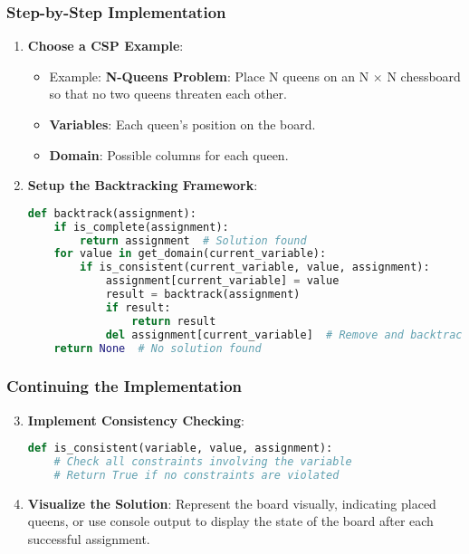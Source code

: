 \documentclass[aspectratio=169]{beamer}
\begin{document}
\begin{frame}[fragile]
    \frametitle{Step-by-Step Implementation}
    \begin{enumerate}
        \item \textbf{Choose a CSP Example}:
            \begin{itemize}
                \item Example: \textbf{N-Queens Problem}: Place N queens on an N $\times$ N chessboard so that no two queens threaten each other.
                \item \textbf{Variables}: Each queen's position on the board.
                \item \textbf{Domain}: Possible columns for each queen.
            \end{itemize}
        \item \textbf{Setup the Backtracking Framework}:
            \begin{lstlisting}[language=Python]
def backtrack(assignment):
    if is_complete(assignment):
        return assignment  # Solution found
    for value in get_domain(current_variable):
        if is_consistent(current_variable, value, assignment):
            assignment[current_variable] = value
            result = backtrack(assignment)
            if result:
                return result
            del assignment[current_variable]  # Remove and backtrack
    return None  # No solution found
            \end{lstlisting}
    \end{enumerate}
\end{frame}

\begin{frame}[fragile]
    \frametitle{Continuing the Implementation}
    \begin{enumerate}
        \setcounter{enumi}{2}
        \item \textbf{Implement Consistency Checking}:
            \begin{lstlisting}[language=Python]
def is_consistent(variable, value, assignment):
    # Check all constraints involving the variable
    # Return True if no constraints are violated
            \end{lstlisting}
        
        \item \textbf{Visualize the Solution}: Represent the board visually, indicating placed queens, or use console output to display the state of the board after each successful assignment.
    \end{enumerate}
\end{frame}
\end{document}
